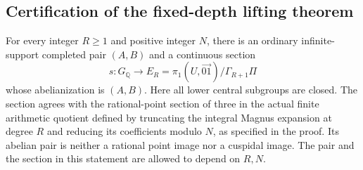 \subsection{Certification of the fixed-depth lifting theorem}

\begin{theorem}
\label{thm:ghost-fixed-depth-survival}
For every integer \(R\ge1\) and positive integer \(N\),
there is an ordinary infinite-support completed pair
\((A,B)\) and a continuous section
\[
 s:G_{\mathbb Q}\longrightarrow
 E_R=\pi_1(U,\overrightarrow{01})/\Gamma_{R+1}\Pi
\]
whose abelianization is \((A,B)\). Here all lower
central subgroups are closed. The section agrees with
the rational-point section of three in the actual
finite arithmetic quotient defined by truncating the
integral Magnus expansion at degree \(R\) and
reducing its coefficients modulo \(N\), as specified
in the proof. Its abelian pair is neither a rational
point image nor a cuspidal image. The pair and the
section in this statement are allowed to depend on
\(R,N\).
\end{theorem}

